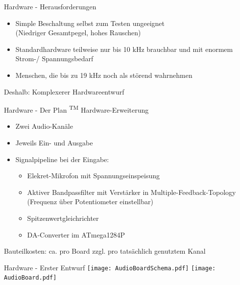 \documentclass[fleqn,11pt]{beamer}
\begin{document}
\begin{frame}{Hardware - Herausforderungen}
	\begin{itemize}
		\item Simple Beschaltung selbst zum Testen ungeeignet\\(Niedriger Gesamtpegel, hohes Rauschen)
		\item Standardhardware teilweise nur bis 10 kHz brauchbar und mit enormem Strom-/ Spannungsbedarf
		\item Menschen, die bis zu 19 kHz noch als störend wahrnehmen
	\end{itemize}
	
	Deshalb: Komplexerer Hardwareentwurf
\end{frame}

\begin{frame}{Hardware - Der Plan \textsuperscript{TM}}
	Hardware-Erweiterung
	\begin{itemize}
		\item Zwei Audio-Kanäle
		\item Jeweils Ein- und Ausgabe
		\item Signalpipeline  bei der Eingabe:
		\begin{itemize}
			\item Elekret-Mikrofon mit Spannungseinspeisung
			\item Aktiver Bandpassfilter mit Verstärker in Multiple-Feedback-Topology \\(Frequenz über Potentiometer einstellbar) 
			\item Spitzenwertgleichrichter
			\item DA-Converter im ATmega1284P
		\end{itemize}
	\end{itemize}
	Bauteilkosten: ca.  pro Board zzgl.  pro tatsächlich genutztem Kanal
\end{frame}


\begin{frame}{Hardware - Erster Entwurf}
	\texttt{[image: AudioBoardSchema.pdf]}
	\texttt{[image: AudioBoard.pdf]}
\end{frame}
\end{document}
